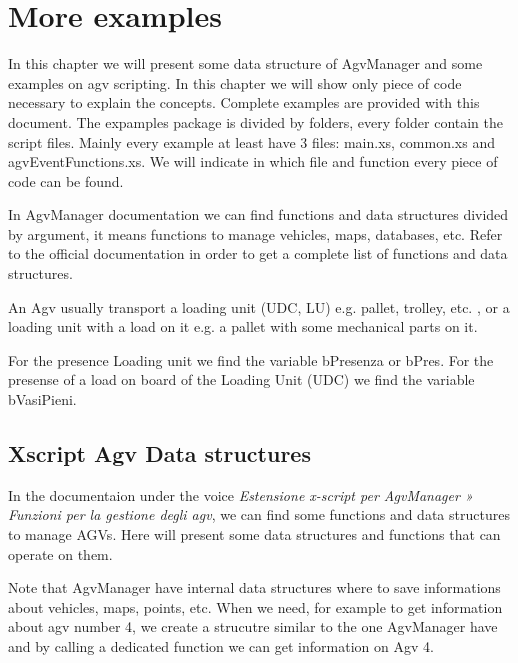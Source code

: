 

\chapter{More examples}
In this chapter we will present some data structure of AgvManager and some examples on agv scripting. In this chapter we will show only piece of code necessary to explain the concepts. Complete examples are provided with this document. The expamples package is divided by folders, every folder contain the script files. Mainly every example at least have 3 files: main.xs, common.xs and agvEventFunctions.xs. We will indicate in which file and function every piece of code can be found.

In AgvManager documentation we can find functions and data structures divided by argument, it means functions to manage vehicles, maps, databases, etc. Refer to the official documentation in order to get a complete list of functions and data structures.

An Agv usually transport a loading unit (UDC, LU) e.g. pallet, trolley, etc. , or a loading unit with a load on it e.g. a pallet with some mechanical parts on it.

For the presence Loading unit we find the variable bPresenza or bPres.
For the presense of a load on board of the Loading Unit (UDC) we find the variable bVasiPieni.

\section{Xscript Agv Data structures}
In the documentaion under the voice \textit{Estensione x-script per AgvManager » Funzioni per la gestione degli agv}, we can find some functions and data structures to manage AGVs. Here will present some data structures and functions that can operate on them.

Note that AgvManager have internal data structures where to save informations about vehicles, maps, points, etc. When we need, for example to get information about agv number 4, we create a strucutre similar to the one AgvManager have and by calling a dedicated function we can get information on Agv 4.

